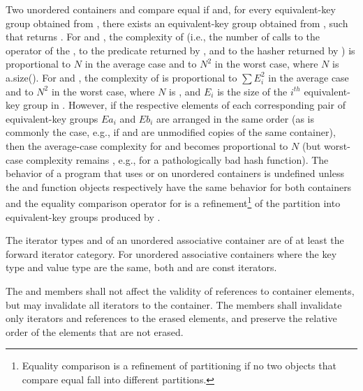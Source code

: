 \pnum
Two unordered containers  and  compare equal if
 and, for every equivalent-key group
 obtained from , there exists an
equivalent-key group  obtained from ,
such that
 returns . For
 and , the complexity of
 (i.e., the number of calls to the \tcode{==} operator
of the , to the predicate returned by ,
and to the hasher returned by ) is proportional to
$N$ in the average case and to $N^2$ in the worst case, where $N$ is
a.size(). For  and ,
the complexity of  is proportional to $\sum E_i^2$
in the average case and to $N^2$ in the worst case, where $N$ is ,
and $E_i$ is the size of the $i^{th}$ equivalent-key group in .
However, if the respective elements of each corresponding pair of
equivalent-key groups $Ea_i$ and $Eb_i$ are arranged in the same order
(as is commonly the case, e.g., if  and  are unmodified copies
of the same container), then the average-case complexity for
 and  becomes
proportional to $N$ (but worst-case complexity remains , e.g., for
a pathologically bad hash function). The behavior of a program that uses
 or  on unordered containers is undefined
unless the  and  function objects respectively have
the same behavior for both containers and the equality comparison operator
for  is a refinement\footnote{Equality comparison is a refinement
of partitioning if no two objects that
compare equal fall into different partitions.}
of the partition into equivalent-key groups produced by .

\pnum
{}%
The iterator types  and  of
an unordered associative container are of at least the forward iterator
category.  For unordered associative containers where the key type and
value type are the same, both  and
 are const iterators.

\pnum
{}%
The  and  members shall not affect the validity of references to
container elements, but may invalidate all iterators to the
container.  The  members shall invalidate only iterators and
references to the erased elements, and preserve the relative order of the
elements that are not erased.

